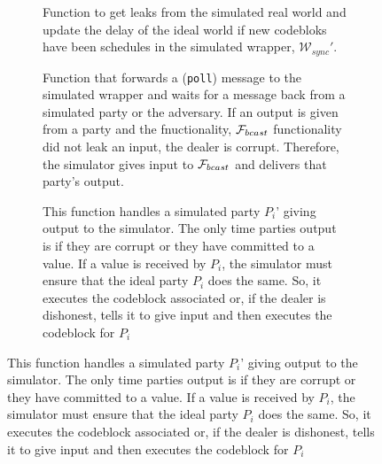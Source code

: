 \begin{figure}[!htb]
	\begin{subfigure}{\textwidth}
		
		\label{fig:algo:simgetleaks}
		\caption{Function to get leaks from the simulated real world and update the delay of the ideal world if new codebloks have been schedules in the simulated wrapper, $\mathcal{W}_{sync}'$.}
	\end{subfigure}
	\newline
	\begin{subfigure}{\textwidth}
		
		\label{fig:algo:poll}
		\caption{Function that forwards a (\texttt{poll}) message to the simulated wrapper and waits for a message back from a simulated party or the adversary. If an output is given from a party and the fnuctionality, $\mathcal{F}_{bcast}$ functionality did not leak an input, the dealer is corrupt. Therefore, the simulator gives input to $\mathcal{F}_{bcast}$ and delivers that party's output.}
	\end{subfigure}
	\newline
	\begin{subfigure}{\textwidth}
		
		\caption{This function handles a simulated party $P_i$' giving output to the simulator. The only time parties output is if they are corrupt or they have committed to a value. If a value is received by $P_i$, the simulator must ensure that the ideal party $P_i$ does the same. So, it executes the codeblock associated or, if the dealer is dishonest, tells it to give input and then executes the codeblock for $P_i$}
	\end{subfigure}
\end{figure}
